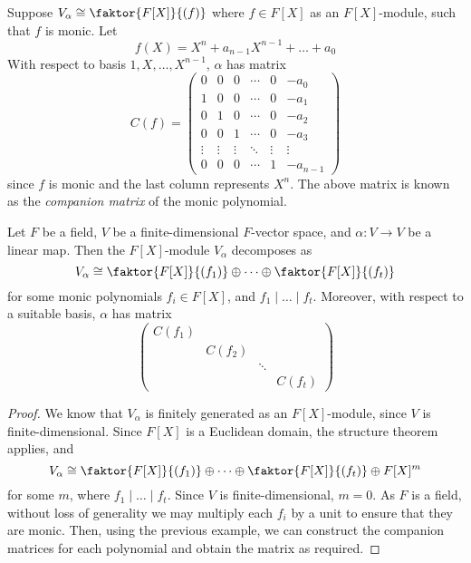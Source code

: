 \begin{example}
	Suppose \( V_\alpha \cong \faktor{F[X]}{(f)} \) where \( f \in F[X] \) as an \( F[X] \)-module, such that \( f \) is monic.
	Let
	\[
		f(X) = X^n + a_{n-1} X^{n-1} + \dots + a_0
	\]
	With respect to basis \( 1, X, \dots, X^{n-1} \), \( \alpha \) has matrix
	\[
		C(f) =
		\begin{pmatrix}
			0      & 0      & 0      & \cdots & 0      & -a_0     \\
			1      & 0      & 0      & \cdots & 0      & -a_1     \\
			0      & 1      & 0      & \cdots & 0      & -a_2     \\
			0      & 0      & 1      & \cdots & 0      & -a_3     \\
			\vdots & \vdots & \vdots & \ddots & \vdots & \vdots   \\
			0      & 0      & 0      & \cdots & 1      & -a_{n-1}
		\end{pmatrix}
	\]
	since \( f \) is monic and the last column represents \( X^n \).
	The above matrix is known as the \textit{companion matrix} of the monic polynomial.
\end{example}
\begin{theorem}
	Let \( F \) be a field, \( V \) be a finite-dimensional \( F \)-vector space, and \( \alpha \colon V \to V \) be a linear map.
	Then the \( F[X] \)-module \( V_\alpha \) decomposes as
	\[
		V_\alpha \cong \faktor{F[X]}{(f_1)} \oplus \dots \oplus \faktor{F[X]}{(f_t)}
	\]
	for some monic polynomials \( f_i \in F[X] \), and \( f_1 \mid \dots \mid f_t \).
	Moreover, with respect to a suitable basis, \( \alpha \) has matrix
	\begin{equation}
		\begin{pmatrix}
			C(f_1)                      \\
			 & C(f_2)                   \\
			 &        & \ddots          \\
			 &        &        & C(f_t)
		\end{pmatrix}
		\tag{\(\ast\ast\)}
	\end{equation}
\end{theorem}
\begin{proof}
	We know that \( V_\alpha \) is finitely generated as an \( F[X] \)-module, since \( V \) is finite-dimensional.
	Since \( F[X] \) is a Euclidean domain, the structure theorem applies, and
	\[
		V_\alpha \cong \faktor{F[X]}{(f_1)} \oplus \dots \oplus \faktor{F[X]}{(f_t)} \oplus F[X]^m
	\]
	for some \( m \), where \( f_1 \mid \dots \mid f_t \).
	Since \( V \) is finite-dimensional, \( m = 0 \).
	As \( F \) is a field, without loss of generality we may multiply each \( f_i \) by a unit to ensure that they are monic.
	Then, using the previous example, we can construct the companion matrices for each polynomial and obtain the matrix as required.
\end{proof}
